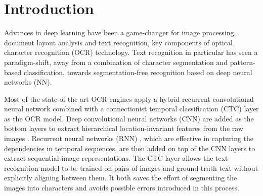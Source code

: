 \documentclass[sigconf]{acmart}
\begin{document}

\maketitle

\section{Introduction}


Advances in deep learning have been a game-changer for image
processing, document layout analysis and text recognition, key components of optical
character recognition (OCR) technology. Text recognition in
particular has seen a paradigm-shift, away from a combination of character
segmentation and pattern-based classification, towards
segmentation-free recognition based on deep neural networks (NN).

Most of the state-of-the-art OCR engines apply a hybrid recurrent convolutional
neural network combined with a connectionist temporal classification (CTC)
\cite{graves2006connectionist} layer as the OCR model. Deep convolutional
neural networks (CNN) \cite{krizhevsky2012imagenet} are added as the bottom
layers to extract hierarchical location-invariant features from the raw images
\cite{wick2018improving}. Recurrent neural networks (RNN)
\cite{mikolov2010recurrent}, which are effective in capturing the dependencies
in temporal sequences, are then added on top of the CNN layers to extract
sequential image representations. The CTC layer allows the text recognition
model to be trained on pairs of images and ground truth text without explicitly
aligning between them. It both saves the effort of segmenting the images into
characters and avoids possible errors introduced in this process.
\end{document}
